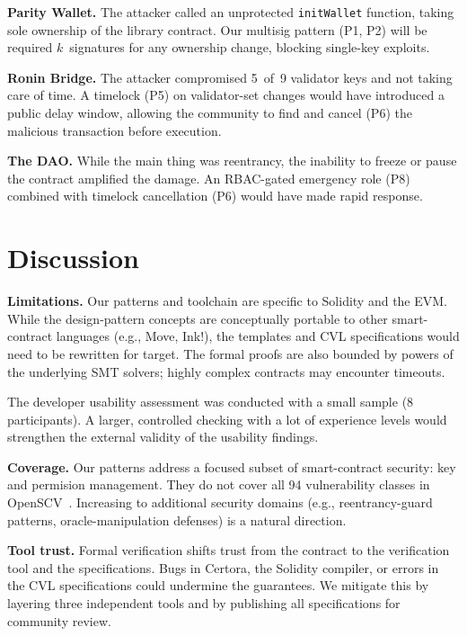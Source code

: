 \documentclass[conference]{IEEEtran}
\begin{document}
\noindent \textbf{Parity Wallet.} The attacker called an unprotected
\texttt{initWallet} function, taking sole ownership of the library
contract.  Our multisig pattern (P1, P2) will be required
$k$~signatures for any ownership change, blocking single-key exploits.

\noindent \textbf{Ronin Bridge.} The attacker compromised 5~of~9 validator
keys and not taking care of time.  A timelock (P5) on validator-set changes would have
introduced a public delay window, allowing the community to find and
cancel (P6) the malicious transaction before execution.

\noindent \textbf{The DAO.} While the main thing was reentrancy,
the inability to freeze or pause the contract amplified the damage.
An RBAC-gated emergency role (P8) combined with timelock cancellation
(P6) would have made rapid response.

\section{Discussion}
\label{sec:discussion}

\textbf{Limitations.}  Our patterns and toolchain are specific to
Solidity and the EVM.  While the design-pattern concepts are
conceptually portable to other smart-contract languages (e.g., Move,
Ink!), the templates and CVL specifications would need to be rewritten
for target.  The formal proofs are also bounded by
powers of the underlying SMT solvers; highly complex contracts
may encounter timeouts.

The developer usability assessment was conducted with a small sample
(8 participants).  A larger, controlled checking with a lot of
experience levels would strengthen the external validity of the
usability findings.

\textbf{Coverage.}  Our patterns address a focused subset of
smart-contract security: key and permision management.  They do not
cover all 94 vulnerability classes in OpenSCV~\cite{vidal2024openscv}.
Increasing to additional security domains (e.g.,
reentrancy-guard patterns, oracle-manipulation defenses) is a
natural direction.

\textbf{Tool trust.}  Formal verification shifts trust from the
contract to the verification tool and the specifications.
Bugs in Certora, the Solidity compiler, or errors in the CVL
specifications could undermine the guarantees.  We mitigate this by
layering three independent tools and by publishing all specifications
for community review.
\end{document}
